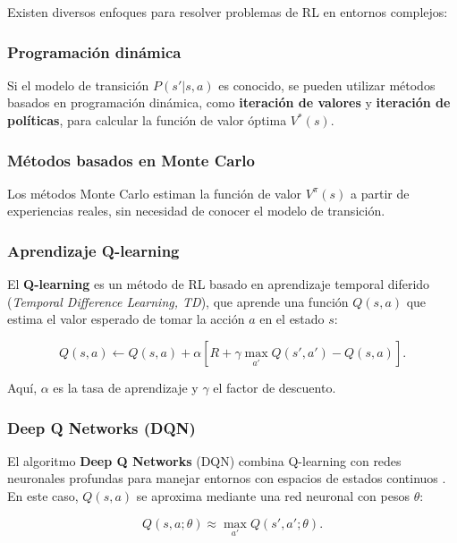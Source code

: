 \begin{itemize}
		Existen diversos enfoques para resolver problemas de RL en entornos complejos:
		
		\subsubsection{Programación dinámica}
		
		Si el modelo de transición \( P(s' | s, a) \) es conocido, se pueden utilizar métodos basados en programación dinámica, como \textbf{iteración de valores} y \textbf{iteración de políticas}, para calcular la función de valor óptima \( V^*(s) \).
		
		\subsubsection{Métodos basados en Monte Carlo}
		
		Los métodos Monte Carlo estiman la función de valor \( V^\pi(s) \) a partir de experiencias reales, sin necesidad de conocer el modelo de transición.
		
		\subsubsection{Aprendizaje Q-learning}
		
		El \textbf{Q-learning} es un método de RL basado en aprendizaje temporal diferido (\textit{Temporal Difference Learning, TD}), que aprende una función \( Q(s, a) \) que estima el valor esperado de tomar la acción \( a \) en el estado \( s \):
		
		\begin{equation}
			Q(s, a) \leftarrow Q(s, a) + \alpha \left[ R + \gamma \max_{a'} Q(s', a') - Q(s, a) \right].
		\end{equation}
		
		Aquí, \( \alpha \) es la tasa de aprendizaje y \( \gamma \) el factor de descuento.
		
		\subsubsection{Deep Q Networks (DQN)}
		
		El algoritmo \textbf{Deep Q Networks} (DQN) combina Q-learning con redes neuronales profundas para manejar entornos con espacios de estados continuos \cite{mnih2015human}. En este caso, \( Q(s, a) \) se aproxima mediante una red neuronal con pesos \( \theta \):
		
		\begin{equation}
			Q(s, a; \theta) \approx \max_{a'} Q(s', a'; \theta).
		\end{equation}
		

\end{itemize}
